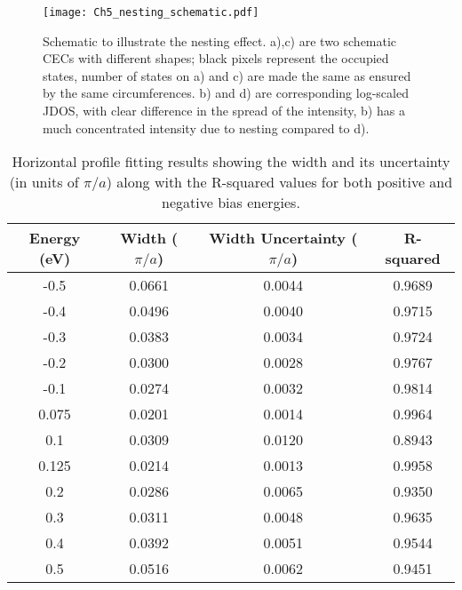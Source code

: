 \begin{figure}
	\texttt{[image: Ch5\_nesting\_schematic.pdf]} 
	\centering
	\caption{Schematic to illustrate the nesting effect. a),c) are two schematic \ac{CEC}s with different shapes; black pixels represent the occupied states, number of states on a) and c) are made the same as ensured by the same circumferences. b) and d) are corresponding log-scaled \ac{JDOS}, with clear difference in the spread of the intensity, b) has a much concentrated intensity due to nesting compared to d).}
	\label{fig:ch5_schema_nesting}
\end{figure}

\begin{table}
	\centering
	\begin{tabular}{|c|c|c|c|}
		\hline
		Energy (eV) & Width ($\pi/a$) & Width Uncertainty ($\pi/a$) & R-squared \\
		\hline
		-0.5 & 0.0661 & 0.0044 & 0.9689 \\
		-0.4 & 0.0496 & 0.0040 & 0.9715 \\
		-0.3 & 0.0383 & 0.0034 & 0.9724 \\
		-0.2 & 0.0300 & 0.0028 & 0.9767 \\
		-0.1 & 0.0274 & 0.0032 & 0.9814 \\
		\hline
		0.075 & 0.0201 & 0.0014 & 0.9964 \\
		0.1 & 0.0309 & 0.0120 & 0.8943 \\
		0.125 & 0.0214 & 0.0013 & 0.9958 \\
		0.2 & 0.0286 & 0.0065 & 0.9350 \\
		0.3 & 0.0311 & 0.0048 & 0.9635 \\
		0.4 & 0.0392 & 0.0051 & 0.9544 \\
		0.5 & 0.0516 & 0.0062 & 0.9451 \\
		\hline
	\end{tabular}
	\caption{Horizontal profile fitting results showing the width and its uncertainty (in units of $\pi/a$) along with the R-squared values for both positive and negative bias energies.}
	\label{tab:qpi_fit_results_combined}
\end{table}

